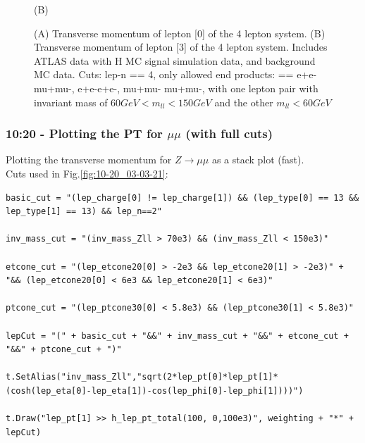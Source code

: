 \begin{figure}[h!]
\begin{minipage}{0.5\textwidth}
        (B)
    \end{minipage}
    \caption{(A) Transverse momentum of lepton [0] of the 4 lepton system. (B) Transverse momentum of lepton [3] of the 4 lepton system. Includes ATLAS data with H MC signal simulation data, and background MC data.  Cuts: lep-n == 4, only allowed end products: == e+e- mu+mu-, e+e-e+e-, mu+mu- mu+mu-, with one lepton pair with invariant mass of $60 GeV < m_{ll} < 150 GeV$ and the other $m_{ll} < 60 GeV$}
    \label{fig}
\end{figure}


\subsubsection*{10:20 - Plotting the PT for $\mu\mu$ (with full cuts)}
Plotting the transverse momentum for $Z \rightarrow \mu\mu$ as a stack plot (fast).
\\
Cuts used in Fig.\ref{fig:10-20_03-03-21}:
\begin{lstlisting}
basic_cut = "(lep_charge[0] != lep_charge[1]) && (lep_type[0] == 13 && lep_type[1] == 13) && lep_n==2"

inv_mass_cut = "(inv_mass_Zll > 70e3) && (inv_mass_Zll < 150e3)"

etcone_cut = "(lep_etcone20[0] > -2e3 && lep_etcone20[1] > -2e3)" + "&& (lep_etcone20[0] < 6e3 && lep_etcone20[1] < 6e3)"

ptcone_cut = "(lep_ptcone30[0] < 5.8e3) && (lep_ptcone30[1] < 5.8e3)"

lepCut = "(" + basic_cut + "&&" + inv_mass_cut + "&&" + etcone_cut + "&&" + ptcone_cut + ")"

t.SetAlias("inv_mass_Zll","sqrt(2*lep_pt[0]*lep_pt[1]*(cosh(lep_eta[0]-lep_eta[1])-cos(lep_phi[0]-lep_phi[1])))")

t.Draw("lep_pt[1] >> h_lep_pt_total(100, 0,100e3)", weighting + "*" + lepCut)
\end{lstlisting}

